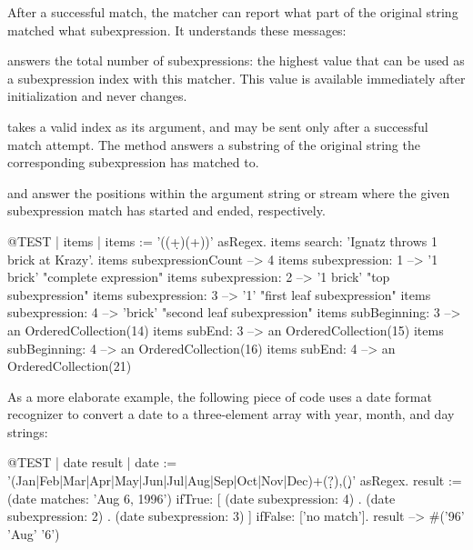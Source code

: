 \documentclass[a4paper,10pt,twoside]{book}
\begin{document}
{After a successful match, the matcher can report what part of the original string matched what subexpression. It understands these messages:

 answers the total number of subexpressions: the highest value that can be used as a subexpression index with this matcher. This value 	is available immediately after initialization and never changes.

 takes a valid index as its argument, and may be sent only after a successful match attempt. The method answers a substring of the original string the corresponding subexpression has matched to.

 and  answer the positions within the argument string or stream where the given subexpression match has started and ended, respectively. 

\begin{code}{@TEST | items |}
items := '((\d+)\s*(\w+))' asRegex.
items search: 'Ignatz throws 1 brick at Krazy'.
items subexpressionCount --> 4
items subexpression: 1      --> '1 brick'    "complete expression"
items subexpression: 2      --> '1 brick'    "top subexpression"
items subexpression: 3      --> '1'             "first leaf subexpression"
items subexpression: 4      --> 'brick'       "second leaf subexpression"
items subBeginning: 3       -->  an OrderedCollection(14)
items subEnd: 3                 -->  an OrderedCollection(15)
items subBeginning: 4       -->  an OrderedCollection(16)
items subEnd: 4                 -->  an OrderedCollection(21)
\end{code}

As a more elaborate example, the following piece of code uses a  date format recognizer to convert a date to a three-element array with year, month, and day strings:

\begin{code}{@TEST | date result |}
date := '(Jan|Feb|Mar|Apr|May|Jun|Jul|Aug|Sep|Oct|Nov|Dec)\s+(\d\d?)\s*,(\d\d)' asRegex.
result := (date matches: 'Aug 6, 1996')
       ifTrue: [{ (date subexpression: 4) .
				(date subexpression: 2) .
				(date subexpression: 3) } ]
        ifFalse: ['no match'].
result --> #('96' 'Aug' '6')
\end{code}

}
\end{document}
